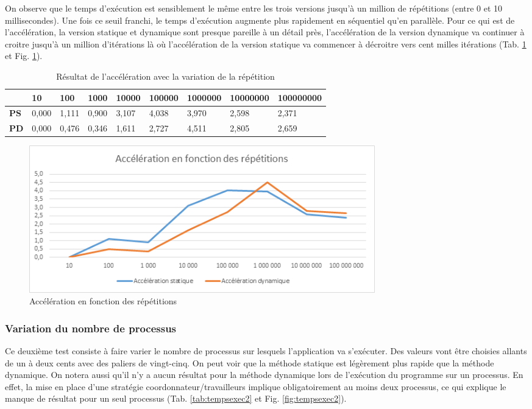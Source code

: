 \documentclass[a4paper,12pt]{article}
\begin{document}
On observe que le temps d'exécution est sensiblement le même entre les trois versions jusqu'à un million de répétitions (entre 0 et 10 millisecondes). Une fois ce seuil franchi, le temps d'exécution augmente plus rapidement en séquentiel qu'en parallèle. Pour ce qui est de l'accélération, la version statique et dynamique sont presque pareille à un détail près, l'accélération de la version dynamique va continuer à croitre jusqu'à un million d'itérations là où l'accélération de la version statique va commencer à décroitre vers cent milles itérations (Tab. \ref{tab:acc1} et Fig. \ref{fig:acc1}).

\begin{table}[H]
\caption{Résultat de l'accélération avec la variation de la répétition}
\label{tab:acc1}
\begin{tabular}{|l|l|l|l|l|l|l|l|l|}
\hline
            & \textbf{10} & \textbf{100} & \textbf{1000} & \textbf{10000} & \textbf{100000} & \textbf{1000000} & \textbf{10000000} & \textbf{100000000} \\ \hline
\textbf{PS} & 0,000       & 1,111        & 0,900         & 3,107          & 4,038           & 3,970            & 2,598             & 2,371              \\ \hline
\textbf{PD} & 0,000       & 0,476        & 0,346         & 1,611          & 2,727           & 4,511            & 2,805             & 2,659              \\ \hline
\end{tabular}
\end{table}

\begin{figure}[H]
\center \includegraphics[width=15cm]{acc1} %
\caption{Accélération en fonction des répétitions}
\label{fig:acc1}
\end{figure}

\subsubsection{Variation du nombre de processus}
Ce deuxième test consiste à faire varier le nombre de processus sur lesquels l'application va s'exécuter. Des valeurs vont être choisies allants de un à deux cents avec des paliers de vingt-cinq. On peut voir que la méthode statique est légèrement plus rapide que la méthode dynamique. On notera aussi qu'il n'y a aucun résultat pour la méthode dynamique lors de l'exécution du programme sur un processus. En effet, la mise en place d'une stratégie coordonnateur/travailleurs implique obligatoirement au moins deux processus, ce qui explique le manque de résultat pour un seul processus (Tab. \ref{tab:tempsexec2} et Fig. \ref{fig:tempsexec2}).
\end{document}
